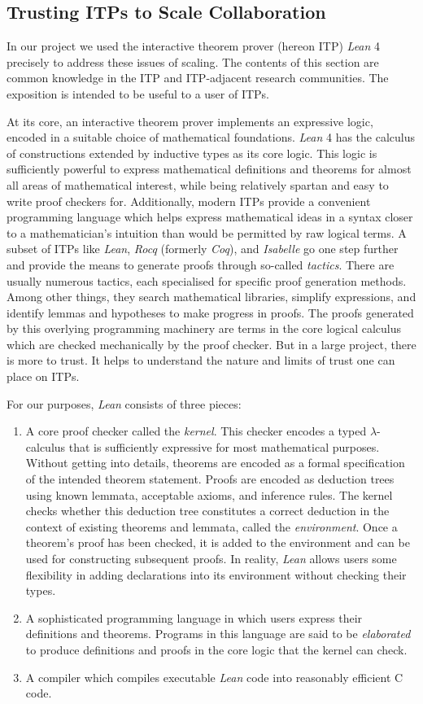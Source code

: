 \subsection{Trusting ITPs to Scale Collaboration}
In our project we used the interactive theorem prover (hereon ITP) \emph{Lean} 4 \cite{the_lean4_paper} precisely to address these issues of scaling. The contents of this section are common knowledge in the ITP and ITP-adjacent research communities. The exposition is intended to be useful to a user of ITPs.

At its core, an interactive theorem prover implements an expressive logic, encoded in a suitable choice of mathematical foundations. \emph{Lean} 4 has the calculus of constructions extended by inductive types as its core logic. This logic is sufficiently powerful to express mathematical definitions and theorems for almost all areas of mathematical interest, while being relatively spartan and easy to write proof checkers for. Additionally, modern ITPs provide a convenient programming language which helps express mathematical ideas in a syntax closer to a mathematician's intuition than would be permitted by raw logical terms. A subset of ITPs like \emph{Lean}, \emph{Rocq} (formerly \emph{Coq}), and \emph{Isabelle} go one step further and provide the means to generate proofs through so-called \emph{tactics}. There are usually numerous tactics, each specialised for specific proof generation methods. Among other things, they search mathematical libraries, simplify expressions, and identify lemmas and hypotheses to make progress in proofs. The proofs generated by this overlying programming machinery are terms in the core logical calculus which are checked mechanically by the proof checker. But in a large project, there is more to trust. It helps to understand the nature and limits of trust one can place on ITPs.

For our purposes, \emph{Lean} consists of three pieces:
\begin{enumerate}
    \item A core proof checker called the \emph{kernel}. This checker encodes a typed $\lambda$-calculus that is sufficiently expressive for most mathematical purposes. Without getting into details, theorems are encoded as a formal specification of the intended theorem statement. Proofs are encoded as deduction trees using known lemmata, acceptable axioms, and inference rules. The kernel checks whether this deduction tree constitutes a correct deduction in the context of existing theorems and lemmata, called the \emph{environment}. Once a theorem's proof has been checked, it is added to the environment and can be used for constructing subsequent proofs. In reality, \emph{Lean} allows users some flexibility in adding declarations into its environment without checking their types.
    \item A sophisticated programming language in which users express their definitions and theorems. Programs in this language are said to  be \emph{elaborated} to produce definitions and proofs in the core logic that the kernel can check.
    \item A compiler which compiles executable \emph{Lean} code into reasonably efficient C code.
\end{enumerate}

